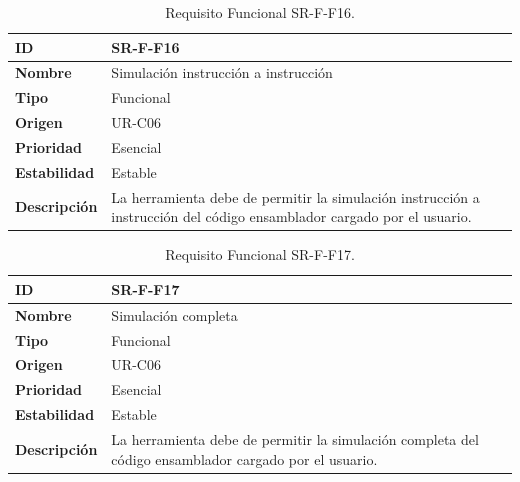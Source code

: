 \begin{center}
\begin{table}[htbp]
\centering
\begin{tabular}{@{}p{2.5cm} p{9cm}@{}} 
\toprule
\textbf{ID} 				& SR-F-F16 \\
\midrule
\textbf{Nombre} 			& Simulación instrucción a instrucción\\
\midrule
\textbf{Tipo} 			& Funcional \\
\midrule
\textbf{Origen} 			& UR-C06 \\
\midrule
\textbf{Prioridad}		& Esencial \\
\midrule
\textbf{Estabilidad} 		& Estable \\
\midrule
\textbf{Descripción} 	& La herramienta debe de permitir la simulación instrucción a instrucción del código ensamblador cargado por el usuario. \\
\bottomrule
\end{tabular}
\caption{Requisito Funcional SR-F-F16.}
\label{tab:srff16}
\end{table}
\end{center}

\begin{center}
\begin{table}[htbp]
\centering
\begin{tabular}{@{}p{2.5cm} p{9cm}@{}} 
\toprule
\textbf{ID} 				& SR-F-F17 \\
\midrule
\textbf{Nombre} 			& Simulación completa\\
\midrule
\textbf{Tipo} 			& Funcional \\
\midrule
\textbf{Origen} 			& UR-C06 \\
\midrule
\textbf{Prioridad}		& Esencial \\
\midrule
\textbf{Estabilidad} 		& Estable \\
\midrule
\textbf{Descripción} 	& La herramienta debe de permitir la simulación completa del código ensamblador cargado por el usuario. \\
\bottomrule
\end{tabular}
\caption{Requisito Funcional SR-F-F17.}
\label{tab:srff17}
\end{table}
\end{center}

